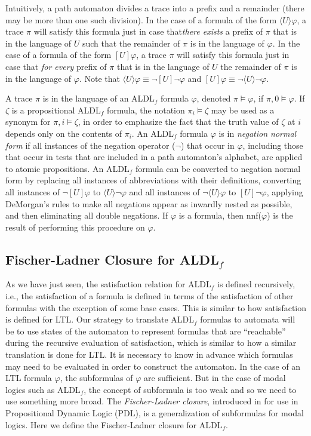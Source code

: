 \documentclass[10pt,a4paper]{amsart}
\theoremstyle{plain}
\theoremstyle{definition}
\theoremstyle{definition}
\newcommand{\dbox}[1]{\langle #1 \rangle}
\newcommand{\bbox}[1]{[ #1 ]}
\DeclareMathOperator{\?}{?}
\begin{document}
Intuitively, a path automaton divides a trace into a prefix and a remainder (there may be more than one such division). In the case of a formula of the form $\dbox{U}\varphi$, a trace $\pi$ will satisfy this formula just in case that\textit{there exists} a prefix of $\pi$ that is in the language of $U$ such that the remainder of $\pi$ is in the language of $\varphi$. In the case of a formula of the form $\bbox{U}\varphi$, a trace $\pi$ will satisfy this formula just in case that \textit{for every} prefix of $\pi$ that is in the language of $U$ the remainder of $\pi$ is in the language of $\varphi$. Note that $\dbox{U}\varphi \equiv \neg \bbox{U}\neg \varphi$
and $\bbox{U}\varphi \equiv \neg \dbox{U}\neg\varphi$.

A trace $\pi$ is in the language of an ALDL$_f$ formula $\varphi$, denoted $\pi \models
\varphi$, if $\pi,0 \models \varphi$. If $\zeta$ is a propositional ALDL$_f$ formula, the notation $\pi_i \models \zeta$ may be used as a synonym for $\pi,i \models \zeta$, in order to emphasize the fact that the truth value of $\zeta$ at $i$ depends only on the contents of $\pi_i$. An ALDL$_f$ formula $\varphi$ is in \textit{negation normal form}
if all instances of the negation operator ($\neg$) that occur in $\varphi$, including those that occur in tests that
are included in a path automaton's alphabet, are applied
to atomic propositions. An ALDL$_f$ formula can be converted to negation normal form by replacing all instances of
abbreviations with their definitions, converting all instances of $\neg\bbox{U}\varphi$ to $\dbox{U}\neg\varphi$ and
all instances of $\neg\dbox{U}\varphi$ to $\bbox{U}\neg\varphi$, applying DeMorgan's rules to make all
negations appear as inwardly nested as possible, and then eliminating all double negations. If $\varphi$ is a formula, then nnf($\varphi$) is the result of performing this procedure on $\varphi$.


\subsection{\texorpdfstring{Fischer-Ladner Closure for ALDL$_f$}{Fischer-Ladner Closure for ALDLf}}


As we have just seen, the satisfaction relation for ALDL$_f$ is defined recursively, i.e., the satisfaction of a formula is defined in terms of the satisfaction of other formulas with the exception of some base cases. This is similar to how satisfaction is defined for LTL. Our strategy to translate ALDL$_f$ formulas to automata will be to use states of the automaton to represent formulas that are ``reachable'' during the recursive evaluation of satisfaction, which is similar to how a similar translation is done for LTL. It is necessary to know in advance which formulas may need to be evaluated in order to construct the automaton. In the case of an LTL formula $\varphi$, the subformulas of $\varphi$ are sufficient. But in the case of modal logics such as ALDL$_f$,
the concept of subformula is too weak and so we need to use something more broad. The \textit{Fischer-Ladner closure}, introduced in \cite{fischer79} for use in Propositional Dynamic Logic (PDL), is a generalization of subformulas for modal logics. Here we define the Fischer-Ladner closure for ALDL$_f$.
\end{document}
